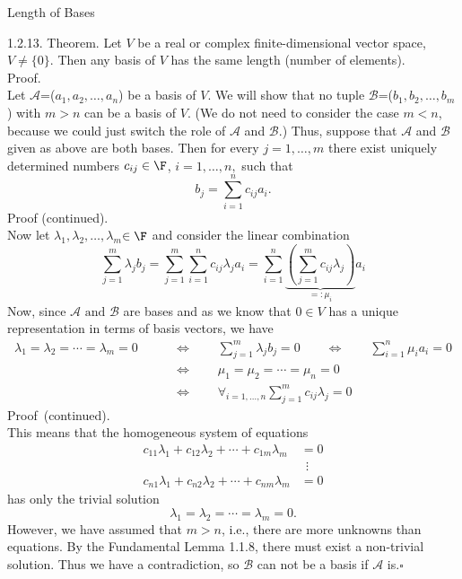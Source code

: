 \documentclass[smaller,hyperref={CJKbookmarks=true}]{beamer}
\newcommand{\myseries}[2]{$#1_1,#1_2,\dots,#1_#2$}
\begin{document}
\begin{frame}{Length of Bases} \begin{spacing}{1.1}
\alert{1.2.13. Theorem.} Let $V$ be a real or complex finite-dimensional vector space, $V\neq\{0\}$. Then any basis of $V$ has the same length (number of elements).\\[12pt]
\alert{Proof.}\\
Let $\mathcal{A}$=(\myseries{a}{n}) be a basis of $V$. We will show that no tuple $\mathcal{B}$=(\myseries{b}{m}) with $m>n$ can be a basis of $V$. (We do not need to consider the case $m<n$, because we could just switch the role of $\mathcal{A}$ and $\mathcal{B}$.) Thus, suppose that $\mathcal{A}$ and $\mathcal{B}$ given as above are both bases. Then for every $j=1,\ldots,m$ there exist uniquely determined numbers $c_{ij}\in\F$, $i=1,\ldots,n,$ such that
\[b_j=\sum_{i=1}^{n}c_{ij}a_i.\]
\newpage
\alert{Proof (continued).}\\
Now let \myseries{\lambda}{m}$\in\F$ and consider the linear combination
\begin{equation*}
  \sum_{j=1}^{m}\lambda_jb_j=\sum_{j=1}^{m}\sum_{i=1}^{n}c_{ij}\lambda_ja_i=\sum_{i=1}^{n}\underbrace{\left(\sum_{j=1}^{m}c_{ij}\lambda_j\right)}_{=:\mu_i}a_i
\end{equation*}
Now, since $\mathcal{A}\text{ and }\mathcal{B}$ are bases and as we know that $0\in V$ has a unique representation in terms of basis vectors, we have
\vspace*{-4mm}
\begin{align*}
  \lambda_1=\lambda_2=\cdots=\lambda_m=0\qquad &\Leftrightarrow\qquad\sum_{j=1}^{m}\lambda_jb_j=0\qquad\Leftrightarrow\qquad\sum_{i=1}^{n}\mu_ia_i=0 \\
   &\Leftrightarrow\qquad \mu_1=\mu_2=\cdots=\mu_n=0 \\
   &\Leftrightarrow\qquad \mathop{\forall}_{i=1,\ldots,n}\sum_{j=1}^{m}c_{ij}\lambda_j=0
\end{align*}
\newpage
\alert{Proof~(continued).}\\
This means that the homogeneous system of equations
\setcounter{equation}{0}
\begin{equation}\label{eq4}
  \begin{aligned}
    c_{11}\lambda_1+c_{12}\lambda_2+\cdots+c_{1m}\lambda_m&=0\\
    &~~\vdots\\
    c_{n1}\lambda_1+c_{n2}\lambda_2+\cdots+c_{nm}\lambda_m&=0
  \end{aligned}
\end{equation}
has only the trivial solution
\[\lambda_1=\lambda_2=\cdots=\lambda_m=0.\]
However, we have assumed that $m > n$, i.e., there are more unknowns than equations. By the Fundamental Lemma 1.1.8, there must exist a non-trivial solution. Thus we have a contradiction, so $\mathcal{B}$ can not be a basis
if $\mathcal{A}$ is.\quad\qquad$\square$
\end{spacing}
\end{frame}
\end{document}
